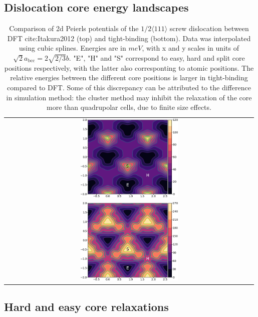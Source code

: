\documentclass[a4paper]{apa6}
\begin{document}
\subsection{Dislocation core energy landscapes}
\label{sec:org67e5cef}
        \begin{table}	
    \begin{tabular}{c}
	     \includegraphics[width=0.4\textwidth]{../Images/itakura_dislocation_energy_landscape_2_labelled.png} \\
             \includegraphics[width=0.4\textwidth]{../Images/tbe_dislocation_energy_landscape_2_labelled.png}  \\
    \end{tabular}		
\caption{Comparison of 2d Peierls potentials of the $1/2\langle 111\rangle$ screw dislocation between DFT cite:Itakura2012 (top) and tight-binding (bottom). Data was interpolated using cubic splines. Energies are in $meV$, with x and y scales in units of $\sqrt{2} a_{\text{bcc}} = 2\sqrt{2/3}b$. "E", "H" and "S" correspond to easy, hard and split core positions respectively, with the latter also corresponting to atomic positions. The relative energies between the different core positions is larger in tight-binding compared to DFT. Some of this discrepancy can be attributed to the difference in simulation method: the cluster method may inhibit the relaxation of the core more than quadrupolar cells, due to finite size effects.}
    \end{table}

\subsection{Hard and easy core relaxations}
\label{sec:orgd5954e3}
\end{document}
